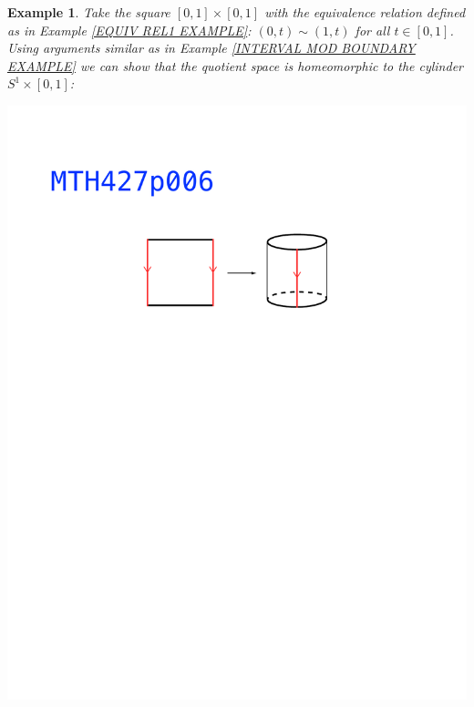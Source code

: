 \documentclass[11pt, letterpaper, oneside]{report}
\theoremstyle{pplain}
\newtheorem{ITERMVALUE THM}[theorem]{Intermediate Value Theorem}
\newtheorem{HEINEBOREL THM}[theorem]{Heine-Borel Theorem}
\newtheorem{UMETR THM}[theorem]{Urysohn Metrization Theorem}
\newtheorem{UMETR2 THM}[theorem]{Urysohn Metrization Theorem (v.2)}
\theoremstyle{ddefinition}
\newtheorem{example}[theorem]{Example}
\theoremstyle{nnn}
\newtheorem{TDA NN}[theorem]{Topological Data Analysis. }
\theoremstyle{eexercise}
\begin{document}
\begin{example}
Take the square $[0,1]\times [0,1]$ with the equivalence relation defined as in 
Example \ref{EQUIV REL1 EXAMPLE}:  $(0,t)\sim (1,t)$ for all $t\in [0,1]$. Using arguments similar as 
in Example \ref{INTERVAL MOD BOUNDARY EXAMPLE} we can show that the quotient space is 
homeomorphic to the cylinder $S^{1}\times [0,1]$:

{\includegraphics[width=\textwidth, trim=0mm 183mm 0mm 57mm, clip]{pictures/MTH427p006.pdf}}   
\end{example}
\end{document}

